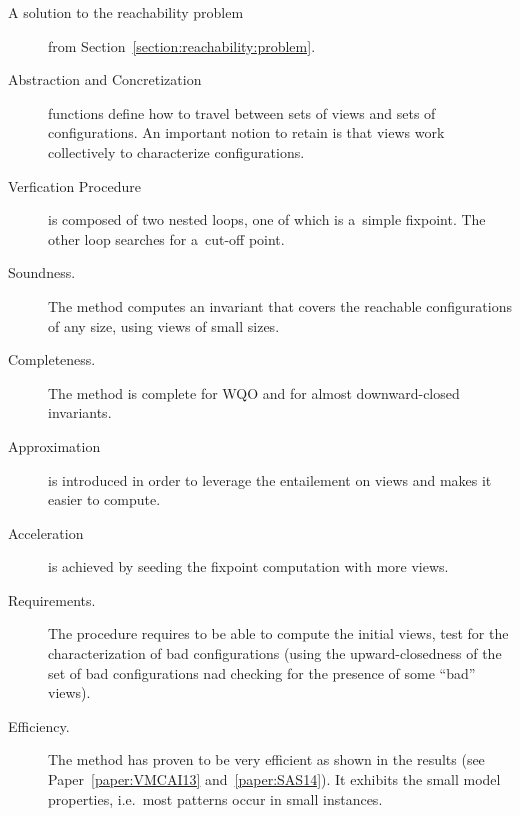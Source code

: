 \begin{description}
\item[A solution to the reachability problem] from
  Section~\ref{section:reachability:problem}.
\item[Abstraction and Concretization] functions define how to travel
  between sets of views and sets of configurations. An important
  notion to retain is that views work collectively to characterize
  configurations.
\item[Verfication Procedure] is composed of two nested loops, one of
  which is a~simple fixpoint. The other loop searches for a~cut-off
  point.
\item[Soundness.] The method computes an invariant that covers the
  reachable configurations of any size, using views of small sizes.
\item[Completeness.] The method is complete for WQO and for almost
  downward-closed invariants.
\item[Approximation] is introduced in order to leverage the
  entailement on views and makes it easier to compute.
\item[Acceleration] is achieved by seeding the fixpoint computation with more views.
\item[Requirements.] The procedure requires to be able to compute the
  initial views, test for the characterization of bad configurations
  (using the upward-closedness of the set of bad configurations nad
  checking for the presence of some ``bad'' views).
\item[Efficiency.] The method has proven to be very efficient as shown
  in the results (see Paper~\ref{paper:VMCAI13}
  and~\ref{paper:SAS14}). It exhibits the small model properties,
  i.e.\ most patterns occur in small instances.
\end{description}
